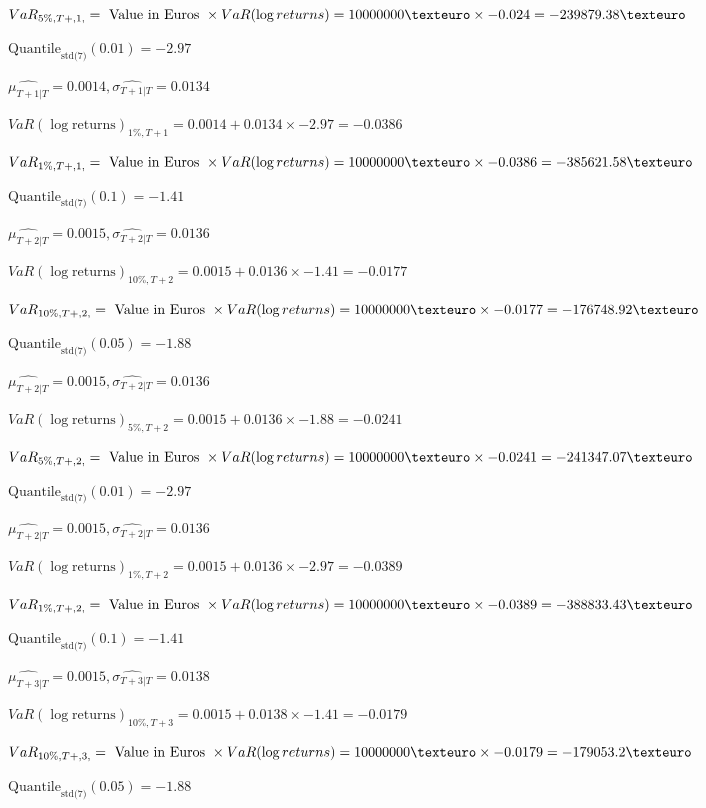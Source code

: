 $VaR_{5\%, T + ,1,} = \text{ Value in Euros } \times VaR(\log returns) = 10 000 000 \texteuro \times-0.024 = -239879.38 \texteuro$


$\text{Quantile}_\text{std(7)}(0.01) = -2.97$

$\hat{\mu_{T+1|T}} = 0.0014, \hat{\sigma_{T+1|T}} = 0.0134$

$VaR(\log \text{returns})_{1\%, T + 1} = 0.0014 + 0.0134\times-2.97 = -0.0386$

$VaR_{1\%, T + ,1,} = \text{ Value in Euros } \times VaR(\log returns) = 10 000 000 \texteuro \times-0.0386 = -385621.58 \texteuro$


$\text{Quantile}_\text{std(7)}(0.1) = -1.41$

$\hat{\mu_{T+2|T}} = 0.0015, \hat{\sigma_{T+2|T}} = 0.0136$

$VaR(\log \text{returns})_{10\%, T + 2} = 0.0015 + 0.0136\times-1.41 = -0.0177$

$VaR_{10\%, T + ,2,} = \text{ Value in Euros } \times VaR(\log returns) = 10 000 000 \texteuro \times-0.0177 = -176748.92 \texteuro$


$\text{Quantile}_\text{std(7)}(0.05) = -1.88$

$\hat{\mu_{T+2|T}} = 0.0015, \hat{\sigma_{T+2|T}} = 0.0136$

$VaR(\log \text{returns})_{5\%, T + 2} = 0.0015 + 0.0136\times-1.88 = -0.0241$

$VaR_{5\%, T + ,2,} = \text{ Value in Euros } \times VaR(\log returns) = 10 000 000 \texteuro \times-0.0241 = -241347.07 \texteuro$


$\text{Quantile}_\text{std(7)}(0.01) = -2.97$

$\hat{\mu_{T+2|T}} = 0.0015, \hat{\sigma_{T+2|T}} = 0.0136$

$VaR(\log \text{returns})_{1\%, T + 2} = 0.0015 + 0.0136\times-2.97 = -0.0389$

$VaR_{1\%, T + ,2,} = \text{ Value in Euros } \times VaR(\log returns) = 10 000 000 \texteuro \times-0.0389 = -388833.43 \texteuro$


$\text{Quantile}_\text{std(7)}(0.1) = -1.41$

$\hat{\mu_{T+3|T}} = 0.0015, \hat{\sigma_{T+3|T}} = 0.0138$

$VaR(\log \text{returns})_{10\%, T + 3} = 0.0015 + 0.0138\times-1.41 = -0.0179$

$VaR_{10\%, T + ,3,} = \text{ Value in Euros } \times VaR(\log returns) = 10 000 000 \texteuro \times-0.0179 = -179053.2 \texteuro$


$\text{Quantile}_\text{std(7)}(0.05) = -1.88$

